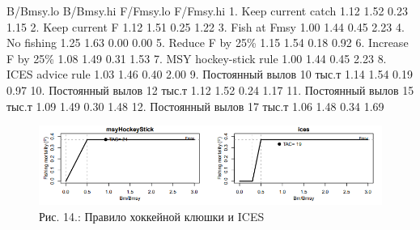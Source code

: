 \documentclass[
  letterpaper,
  DIV=11,
  numbers=noendperiod]{scrreprt}
\newenvironment{Shaded}{\begin{snugshade}}{\end{snugshade}}
\newcommand{\DecValTok}[1]{\textcolor[rgb]{0.68,0.00,0.00}{#1}}
\newcommand{\FloatTok}[1]{\textcolor[rgb]{0.68,0.00,0.00}{#1}}
\newcommand{\NormalTok}[1]{\textcolor[rgb]{0.00,0.23,0.31}{#1}}
\newcommand{\SpecialCharTok}[1]{\textcolor[rgb]{0.37,0.37,0.37}{#1}}
\begin{document}
\begin{Shaded}
\begin{Highlighting}[]
\NormalTok{                              B}\SpecialCharTok{/}\NormalTok{Bmsy.lo B}\SpecialCharTok{/}\NormalTok{Bmsy.hi F}\SpecialCharTok{/}\NormalTok{Fmsy.lo F}\SpecialCharTok{/}\NormalTok{Fmsy.hi}
\FloatTok{1.}\NormalTok{ Keep current catch              }\FloatTok{1.12}      \FloatTok{1.52}      \FloatTok{0.23}      \FloatTok{1.15}
\FloatTok{2.}\NormalTok{ Keep current F                  }\FloatTok{1.12}      \FloatTok{1.51}      \FloatTok{0.25}      \FloatTok{1.22}
\FloatTok{3.}\NormalTok{ Fish at Fmsy                    }\FloatTok{1.00}      \FloatTok{1.44}      \FloatTok{0.45}      \FloatTok{2.23}
\FloatTok{4.}\NormalTok{ No fishing                      }\FloatTok{1.25}      \FloatTok{1.63}      \FloatTok{0.00}      \FloatTok{0.00}
\FloatTok{5.}\NormalTok{ Reduce F by }\DecValTok{25}\NormalTok{\%                 }\FloatTok{1.15}      \FloatTok{1.54}      \FloatTok{0.18}      \FloatTok{0.92}
\FloatTok{6.}\NormalTok{ Increase F by }\DecValTok{25}\NormalTok{\%               }\FloatTok{1.08}      \FloatTok{1.49}      \FloatTok{0.31}      \FloatTok{1.53}
\FloatTok{7.}\NormalTok{ MSY hockey}\SpecialCharTok{{-}}\NormalTok{stick rule           }\FloatTok{1.00}      \FloatTok{1.44}      \FloatTok{0.45}      \FloatTok{2.23}
\FloatTok{8.}\NormalTok{ ICES advice rule                }\FloatTok{1.03}      \FloatTok{1.46}      \FloatTok{0.40}      \FloatTok{2.00}
\FloatTok{9.}\NormalTok{ Постоянный вылов }\DecValTok{10}\NormalTok{ тыс.т       }\FloatTok{1.14}      \FloatTok{1.54}      \FloatTok{0.19}      \FloatTok{0.97}
\FloatTok{10.}\NormalTok{ Постоянный вылов }\DecValTok{12}\NormalTok{ тыс.т      }\FloatTok{1.12}      \FloatTok{1.52}      \FloatTok{0.24}      \FloatTok{1.17}
\FloatTok{11.}\NormalTok{ Постоянный вылов }\DecValTok{15}\NormalTok{ тыс.т      }\FloatTok{1.09}      \FloatTok{1.49}      \FloatTok{0.30}      \FloatTok{1.48}
\FloatTok{12.}\NormalTok{ Постоянный вылов }\DecValTok{17}\NormalTok{ тыс.т      }\FloatTok{1.06}      \FloatTok{1.48}      \FloatTok{0.34}      \FloatTok{1.69}
\end{Highlighting}
\end{Shaded}

\begin{figure}[H]

{\centering \includegraphics[width=0.8\linewidth,height=\textheight,keepaspectratio]{images/SPICT14.PNG}

}

\caption{Рис. 14.: Правило хоккейной клюшки и ICES}

\end{figure}%
\end{document}
